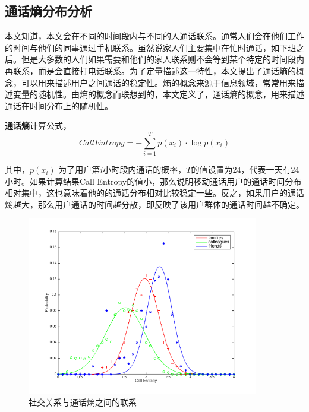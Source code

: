 \subsection{通话熵分布分析}

本文知道，本文会在不同的时间段内与不同的人通话联系。通常人们会在他们工作的时间与他们的同事通过手机联系。虽然说家人们主要集中在忙时通话，如下班之后。但是大多数的人们如果需要和他们的家人联系则不会等到某个特定的时间段内再联系，而是会直接打电话联系。为了定量描述这一特性，本文提出了通话熵的概念，可以用来描述用户之间通话的稳定性。熵的概念来源于信息领域，常常用来描述变量的随机性。由熵的概念而联想到的，本文定义了，通话熵的概念，用来描述通话在时间分布上的随机性。

\begin{definition}
    \label{call-entrpy-concept}
    \textbf{通话熵}计算公式，
    \begin{equation}
        CallEntropy = - \sum_{i=1}^{T}p(x_i)\cdot\log p(x_i)
    \end{equation}
\end{definition}


其中，$p(x_i)$ 为了用户第$i$小时段内通话的概率，$T$的值设置为24，代表一天有24小时。如果计算结果Call Entropy的值小，那么说明移动通话用户的通话时间分布相对集中，这也意味着他的的通话分布相对比较稳定一些。反之，如果用户的通话熵越大，那么用户通话的时间越分散，即反映了该用户群体的通话时间越不确定。


\begin{figure}[!ht]
    \centering
    \includegraphics[scale=1,width=0.9\textwidth]{figure/CallEntropyDistribution.png}
    \caption{社交关系与通话熵之间的联系}
    \label{fig-call-entropy}
\end{figure}


